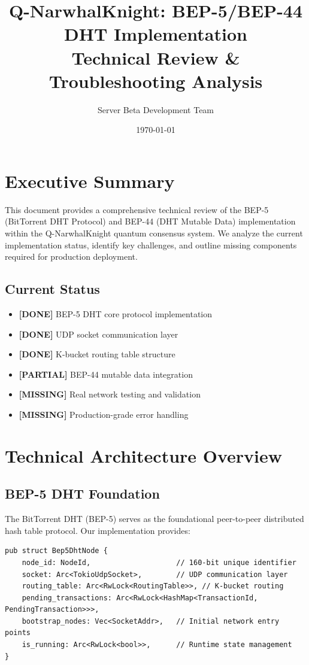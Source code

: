 \documentclass[11pt,a4paper]{article}
\title{\textbf{Q-NarwhalKnight: BEP-5/BEP-44 DHT Implementation}\\
\large Technical Review \& Troubleshooting Analysis}
\author{Server Beta Development Team}
\date{\today}
\begin{document}
\maketitle

\section{Executive Summary}

This document provides a comprehensive technical review of the BEP-5 (BitTorrent DHT Protocol) and BEP-44 (DHT Mutable Data) implementation within the Q-NarwhalKnight quantum consensus system. We analyze the current implementation status, identify key challenges, and outline missing components required for production deployment.

\subsection{Current Status}
\begin{itemize}
    \item \textbf{[DONE]} BEP-5 DHT core protocol implementation
    \item \textbf{[DONE]} UDP socket communication layer
    \item \textbf{[DONE]} K-bucket routing table structure
    \item \textbf{[PARTIAL]} BEP-44 mutable data integration
    \item \textbf{[MISSING]} Real network testing and validation
    \item \textbf{[MISSING]} Production-grade error handling
\end{itemize}

\section{Technical Architecture Overview}

\subsection{BEP-5 DHT Foundation}

The BitTorrent DHT (BEP-5) serves as the foundational peer-to-peer distributed hash table protocol. Our implementation provides:

\begin{lstlisting}
pub struct Bep5DhtNode {
    node_id: NodeId,                    // 160-bit unique identifier
    socket: Arc<TokioUdpSocket>,        // UDP communication layer
    routing_table: Arc<RwLock<RoutingTable>>, // K-bucket routing
    pending_transactions: Arc<RwLock<HashMap<TransactionId, PendingTransaction>>>,
    bootstrap_nodes: Vec<SocketAddr>,   // Initial network entry points
    is_running: Arc<RwLock<bool>>,      // Runtime state management
}
\end{lstlisting}
\end{document}
